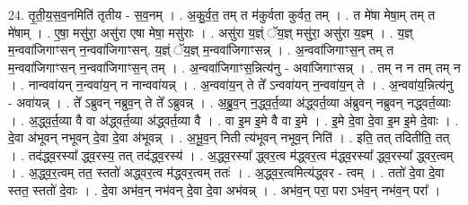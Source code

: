 \documentclass[17pt]{extarticle}
\begin{document}
24. तृ॒ती॒य॒स॒व॒नमिति॑ तृतीय - स॒व॒नम् । . अ॒कु॒र्व॒त॒ तम् त म॑कुर्वता कुर्वत॒ तम् । . त मे॑षा मेषा॒म् तम् त मे॑षाम् । . ए॒षा॒ मसु॑रा॒ असु॑रा एषा मेषा॒ मसु॑राः । . असु॑रा य॒ज्ञ्ं ॅय॒ज्ञ् मसु॑रा॒ असु॑रा य॒ज्ञ्म् । . य॒ज्ञ् म॒न्ववा॑जिगाꣳसन् न॒न्ववा॑जिगाꣳसन्. य॒ज्ञ्ं ॅय॒ज्ञ् म॒न्ववा॑जिगाꣳसन्न् । . अ॒न्ववा॑जिगाꣳस॒न् तम् त म॒न्ववा॑जिगाꣳसन् न॒न्ववा॑जिगाꣳस॒न् तम् । . अ॒न्ववा॑जिगाꣳस॒न्नित्य॑नु - अवा॑जिगाꣳसन्न् । . तम् न न तम् तम् न । . नान्ववा॑यन् न॒न्ववा॑य॒न् न नान्ववा॑यन्न् । . अ॒न्ववा॑य॒न् ते ते᳚ ऽन्ववा॑यन् न॒न्ववा॑य॒न् ते । . अ॒न्ववा॑य॒न्नित्य॑नु - अवा॑यन्न् । . ते᳚ ऽब्रुवन् नब्रुव॒न् ते ते᳚ ऽब्रुवन्न् । . अ॒ब्रु॒व॒न् न॒द्ध्व॒र्त॒व्या अ॑द्ध्वर्त॒व्या अ॑ब्रुवन् नब्रुवन् नद्ध्वर्त॒व्याः । . अ॒द्ध्व॒र्त॒व्या वै वा अ॑द्ध्वर्त॒व्या अ॑द्ध्वर्त॒व्या वै । . वा इ॒म इ॒मे वै वा इ॒मे । . इ॒मे दे॒वा दे॒वा इ॒म इ॒मे दे॒वाः । . दे॒वा अ॑भूवन् नभूवन् दे॒वा दे॒वा अ॑भूवन्न् । . अ॒भू॒व॒न् निती त्य॑भूवन् नभूव॒न् निति॑ । . इति॒ तत् तदितीति॒ तत् । . तद॑द्ध्व॒रस्या᳚ द्ध्व॒रस्य॒ तत् तद॑द्ध्व॒रस्य॑ । . अ॒द्ध्व॒रस्या᳚ द्ध्वर॒त्व म॑द्ध्वर॒त्व म॑द्ध्व॒रस्या᳚ द्ध्व॒रस्या᳚ द्ध्वर॒त्वम् । . अ॒द्ध्व॒र॒त्वम् तत॒ स्ततो॑ अद्ध्वर॒त्व म॑द्ध्वर॒त्वम् ततः॑ । . अ॒द्ध्व॒र॒त्वमित्य॑द्ध्वर - त्वम् । . ततो॑ दे॒वा दे॒वा स्तत॒ स्ततो॑ दे॒वाः । . दे॒वा अभ॑व॒न् नभ॑वन् दे॒वा दे॒वा अभ॑वन्न् । . अभ॑व॒न् परा॒ परा ऽभ॑व॒न् नभ॑व॒न् परा᳚ । \newline
\end{document}
